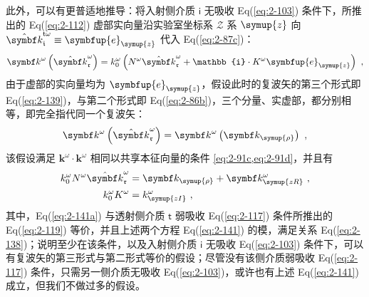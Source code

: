 此外，可以有更普适地推导：将入射侧介质 $\mathsf{i}$ 无吸收 Eq(\ref{eq:2-103}) 条件下，所推出的 Eq(\ref{eq:2-112}) 虚部实向量沿实验室坐标系 $\mathcal{Z}$ 系 $\symup{z}$ 向 $\hat{\symbf k}_{\mathfrak{i}}^{\mathsf{t}\omega} \equiv \symbfup{e}_{\symup{z}}$ 代入 Eq(\ref{eq:2-87c})：
\begin{equation} \label{eq:2-139}
	{\symbf k}^\omega \left( \hat{\symbf k}_{\mathfrak{r}}^\omega \right) = k^\omega_{0} \left( N^\omega \hat{\symbf k}_{\mathfrak{r}}^\omega + \mathbb{i} \cdot K^\omega \symbfup{e}_{\symup{z}} \right) ~,
\end{equation}
由于虚部的实向量均为 $\symbfup{e}_{\symup{z}}$，假设此时的复波矢的第三个形式即 Eq(\ref{eq:2-139})，与第二个形式即 Eq(\ref{eq:2-86b})，三个分量、实虚部，都分别相等，即完全指代同一个复波矢：
\begin{equation} \label{eq:2-140}
	{\symbf k}^\omega \left( \hat{\symbf k}_{\mathfrak{r}}^\omega \right) = {\symbf k}^\omega \left( \symbf k_{\symup{\rho}} \right) ~,
\end{equation}
该假设满足 ${\symbf k}^\omega \cdot {\symbf k}^\omega$ 相同以共享本征向量的条件 \cref{eq:2-91c,eq:2-91d}，并且有
\begin{subequations} \label{eq:2-141}
\abovedisplayskip=0pt
\belowdisplayskip=10pt
\begin{align}
	k^\omega_{0} N^\omega \hat{\symbf k}_{\mathfrak{r}}^\omega &= \symbf k_{\symup{\rho}} + \symbf k^\omega_{\symup{zR}} \label{eq:2-141a}~, \\ k^\omega_{0} K^\omega &= k^\omega_{\symup{zI}} \label{eq:2-141b}~,
\end{align}
\end{subequations}
其中，Eq(\ref{eq:2-141a}) 与透射侧介质 $\mathsf{t}$ 弱吸收 Eq(\ref{eq:2-117}) 条件所推出的 Eq(\ref{eq:2-119}) 等价，并且上述两个方程 Eq(\ref{eq:2-141}) 的模，满足关系 Eq(\ref{eq:2-138})；说明至少在该条件，以及入射侧介质 $\mathsf{i}$ 无吸收 Eq(\ref{eq:2-103}) 条件下，可以有复波矢的第三形式与第二形式等价的假设；尽管没有该侧介质弱吸收 Eq(\ref{eq:2-117}) 条件，只需另一侧介质无吸收 Eq(\ref{eq:2-103})，或许也有上述 Eq(\ref{eq:2-141}) 成立，但我们不做过多的假设。

